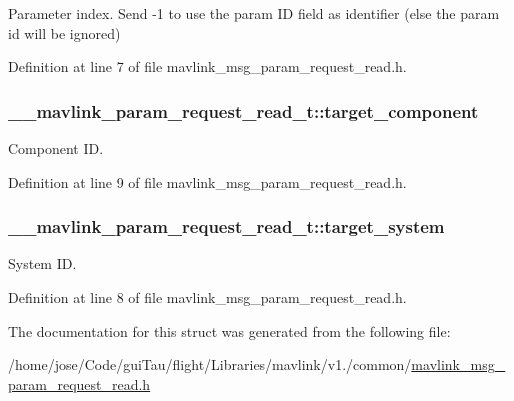 Parameter index. Send -\/1 to use the param I\-D field as identifier (else the param id will be ignored) 



Definition at line 7 of file mavlink\-\_\-msg\-\_\-param\-\_\-request\-\_\-read.\-h.

\hypertarget{struct____mavlink__param__request__read__t_aa865f64059877480b11a2f476d1a8ca4}{
\subsubsection[{target\-\_\-component}]{ \-\_\-\-\_\-mavlink\-\_\-param\-\_\-request\-\_\-read\-\_\-t\-::target\-\_\-component}}\label{struct____mavlink__param__request__read__t_aa865f64059877480b11a2f476d1a8ca4}


Component I\-D. 



Definition at line 9 of file mavlink\-\_\-msg\-\_\-param\-\_\-request\-\_\-read.\-h.

\hypertarget{struct____mavlink__param__request__read__t_adc4407f944beba256a385768ea61e588}{
\subsubsection[{target\-\_\-system}]{ \-\_\-\-\_\-mavlink\-\_\-param\-\_\-request\-\_\-read\-\_\-t\-::target\-\_\-system}}\label{struct____mavlink__param__request__read__t_adc4407f944beba256a385768ea61e588}


System I\-D. 



Definition at line 8 of file mavlink\-\_\-msg\-\_\-param\-\_\-request\-\_\-read.\-h.



The documentation for this struct was generated from the following file\-:\begin{DoxyCompactItemize}
\item 
/home/jose/\-Code/gui\-Tau/flight/\-Libraries/mavlink/v1./common/\hyperlink{mavlink__msg__param__request__read_8h}{mavlink\-\_\-msg\-\_\-param\-\_\-request\-\_\-read.\-h}\end{DoxyCompactItemize}
